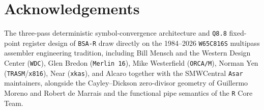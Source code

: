 \documentclass[11pt]{article}
\theoremstyle{plain}
\theoremstyle{definition}
\begin{document}
\section*{Acknowledgements}
The three-pass deterministic symbol-convergence architecture and \texttt{Q8.8} fixed-point register design of \texttt{BSA-R} draw directly on the 1984--2026 \texttt{W65C816S} multipass assembler engineering tradition, including Bill Mensch and the Western Design Center (\texttt{WDC}), Glen Bredon (\texttt{Merlin 16}), Mike Westerfield (\texttt{ORCA/M}), Norman Yen (\texttt{TRASM}/\texttt{x816}), Near (\texttt{xkas}), and Alcaro together with the SMWCentral \texttt{Asar} maintainers, alongside the Cayley--Dickson zero-divisor geometry of Guillermo Moreno and Robert de Marrais and the functional pipe semantics of the \texttt{R} Core Team.
\end{document}
